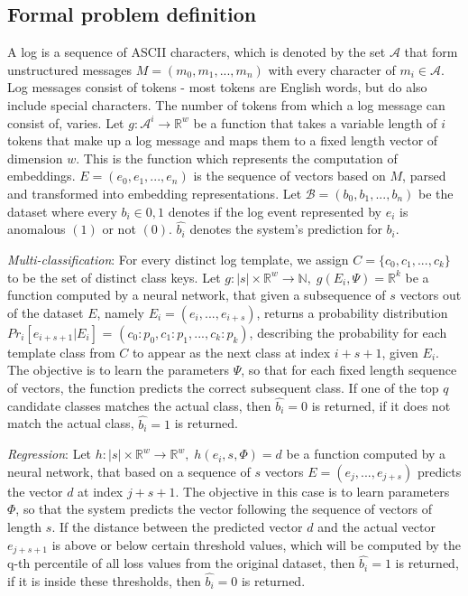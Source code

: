 \subsection{Formal problem definition \label{sec:formal_problem_definition}}
A log is a sequence of ASCII characters, which is denoted by the set $\mathcal{A}$ that form unstructured messages $M = (m_0, m_1, ..., m_n)$ with every character of $m_i \in \mathcal{A}$. Log messages consist of tokens - most tokens are English words, but do also include special characters. The number of tokens from which a log message can consist of, varies. 
Let $g: \mathcal{A}^i \rightarrow \mathbb{R}^w$ be a function that takes a variable length of $i$ tokens that make up a log message and maps them to a fixed length vector of dimension $w$. This is the function which represents the computation of embeddings. $E = (e_0, e_1, ..., e_n)$ is the sequence of vectors based on $M$, parsed and transformed into embedding representations. Let $\mathcal{B} = (b_0, b_1, ..., b_n)$ be the dataset where every $b_i \in {0,1}$ denotes if the log event represented by $e_i$ is anomalous $(1)$ or not $(0)$. $\hat{b_i}$ denotes the system's prediction for $b_i$.

\textit{Multi-classification}: For every distinct log template, we assign $C = \{c_0, c_1, ..., c_k\}$ to be the set of distinct class keys. Let $g: \left|s\right| \times \mathbb{R}^w \rightarrow \mathbb{N},\;  g(E_i, \Psi) = \mathbb{R}^k$ be a function computed by a neural network, that given a subsequence of $s$ vectors out of the dataset $E$, namely $E_i = (e_i, ..., e_{i+s})$, returns a probability distribution $Pr_i[e_{i+s+1}|E_i]$ = $(c_0: p_0, c_1: p_1, ..., c_k: p_k)$, describing the probability for each template class from $C$ to appear as the next class at index $i+s+1$, given $E_i$. The objective is to learn the parameters $\Psi$, so that for each fixed length sequence of vectors, the function predicts the correct subsequent class. If one of the top $q$ candidate classes matches the actual class, then $\hat{b_i} = 0$ is returned, if it does not match the actual class, $\hat{b_i} = 1$ is returned.

\textit{Regression}: Let $h: \left|s\right| \times \mathbb{R}^w \rightarrow \mathbb{R}^w, \; h(e_i, s, \Phi)=d$ be a function computed by a neural network, that based on a sequence of $s$ vectors $E = (e_j, ..., e_{j+s})$ predicts the vector $d$ at index $j+s+1$. The objective in this case is to learn parameters $\Phi$, so that the system predicts the vector following the sequence of vectors of length $s$. If the distance between the predicted vector $d$ and the actual vector $e_{j+s+1}$ is above or below certain threshold values, which will be computed by the q-th percentile of all loss values from the original dataset, then $\hat{b_i} = 1$ is returned, if it is inside these thresholds, then $\hat{b_i} = 0$ is returned.

